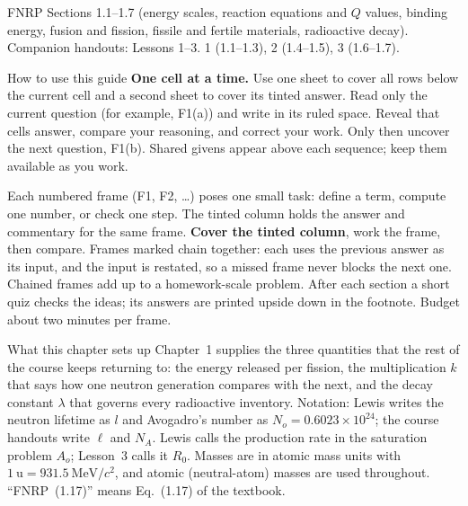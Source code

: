 \documentclass[compact]{ne630handout}
\newcommand{\MeV}[1]{\SI{#1}{\mega\electronvolt}}
\newcommand{\amu}[1]{\SI{#1}{\atomicmassunit}}
\begin{document}
 {FNRP Sections 1.1--1.7 (energy scales, reaction equations and $Q$ values, binding energy, fusion and fission, fissile and fertile materials, radioactive decay). Companion handouts: Lessons 1--3.}
 {1 (1.1--1.3), 2 (1.4--1.5), 3 (1.6--1.7).}

\begin{KeyBox}{How to use this guide}
\ifguidehandwriting
\textbf{One cell at a time.} Use one sheet to cover all rows below the current cell and a second sheet to cover its tinted answer. Read only the current question (for example, F1(a)) and write in its ruled space. Reveal that cell\textquotesingle s answer, compare your reasoning, and correct your work. Only then uncover the next question, F1(b). Shared givens appear above each sequence; keep them available as you work.\par\smallskip
\fi
Each numbered frame (F1, F2, \ldots) poses one small task: define a term, compute one number, or check one step. The tinted column holds the answer and commentary for the same frame. \textbf{Cover the tinted column}, work the frame, then compare. Frames marked \Chain chain together: each uses the previous answer as its input, and the input is restated, so a missed frame never blocks the next one. Chained frames add up to a homework-scale problem. After each section a short quiz checks the ideas; its answers are printed upside down in the footnote. Budget about two minutes per frame.
\end{KeyBox}

\begin{KeyBox}{What this chapter sets up}
Chapter~1 supplies the three quantities that the rest of the course keeps returning to: the energy released per fission, the multiplication $k$ that says how one neutron generation compares with the next, and the decay constant $\lambda$ that governs every radioactive inventory. Notation: Lewis writes the neutron lifetime as $l$ and Avogadro's number as $N_o=0.6023\times10^{24}$; the course handouts write $\ell$ and $N_A$. Lewis calls the production rate in the saturation problem $A_o$; Lesson~3 calls it $R_0$. Masses are in atomic mass units with $\amu{1}=\MeV{931.5}/c^2$, and atomic (neutral-atom) masses are used throughout. ``FNRP~(1.17)'' means Eq.~(1.17) of the textbook.
\end{KeyBox}
\end{document}
